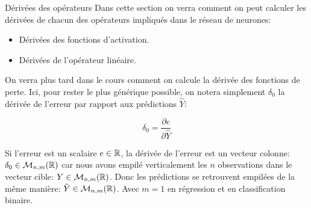 \begin{frame}{Dérivées des opérateurs}
	Dans cette section on verra comment on peut calculer les dérivées de chacun des opérateurs impliqués dans le réseau de neurones:

	\begin{itemize}
		\item Dérivées des fonctions d'activation.
		\item Dérivées de l'opérateur linéaire.
	\end{itemize}

	\vspace{0.3cm}
	\pause

	On verra plus tard dans le cours comment on calcule la dérivée des fonctions de perte. Ici, pour rester le plus générique possible, on notera simplement $\delta_0$ la dérivée de l'erreur par rapport aux prédictions $\hat{Y}$:

	\begin{equation*}
		\delta_0 = \frac{\partial{e}}{\partial{\hat{Y}}}
	\end{equation*}

	\vspace{0.3cm}
	\pause

	Si l'erreur est un scalaire $e \in \mathbb{R}$, la dérivée de l'erreur est un vecteur colonne: $\delta_0 \in \mathcal{M}_{n,m}(\mathbb{R})$ car nous avons empilé verticalement les $n$ observations dans le vecteur cible: $Y \in \mathcal{M}_{n,m}(\mathbb{R})$. Donc les prédictions se retrouvent empilées de la même manière: $\hat{Y} \in \mathcal{M}_{n,m}(\mathbb{R})$. Avec $m=1$ en régression et en classification binaire.
\end{frame}


